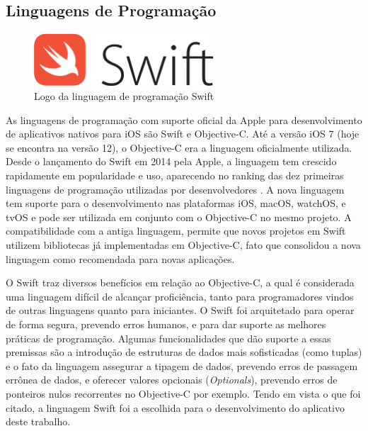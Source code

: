 \subsection{Linguagens de Programação}
\begin{figure}[h]
    \centering
    \includegraphics[width=0.6\textwidth]{pfc/figuras/swift.png}
    \caption{Logo da linguagem de programação Swift}
    \label{fig:swift}
\end{figure}
As linguagens de programação com suporte oficial da Apple para desenvolvimento de aplicativos nativos para iOS são Swift e Objective-C. Até a versão iOS 7 (hoje se encontra na versão 12), o Objective-C era a linguagem oficialmente utilizada. Desde o lançamento do Swift em 2014 pela Apple, a linguagem tem crescido rapidamente em popularidade e uso, aparecendo no ranking das dez primeiras linguagens de programação utilizadas por desenvolvedores . A nova linguagem tem suporte para o desenvolvimento nas plataformas iOS, macOS, watchOS, e tvOS e pode ser utilizada em conjunto com o Objective-C no mesmo projeto. A compatibilidade com a antiga linguagem, permite que novos projetos em Swift utilizem bibliotecas já implementadas em Objective-C, fato que consolidou a nova linguagem como recomendada para novas aplicações.

O Swift traz diversos benefícios em relação ao Objective-C, a qual é considerada uma linguagem difícil de alcançar proficiência, tanto para programadores vindos de outras linguagens quanto para iniciantes. O Swift foi arquitetado para operar de forma segura, prevendo erros humanos, e para dar suporte as melhores práticas de programação. Algumas funcionalidades que dão suporte a essas premissas são a introdução de estruturas de dados mais sofisticadas (como tuplas) e o fato da linguagem assegurar a tipagem de dados, prevendo erros de passagem errônea de dados, e oferecer valores opcionais (\textit{Optionals}), prevendo erros de ponteiros nulos recorrentes no Objective-C por exemplo. Tendo em vista o que foi citado, a linguagem Swift foi a escolhida para o desenvolvimento do aplicativo deste trabalho.

